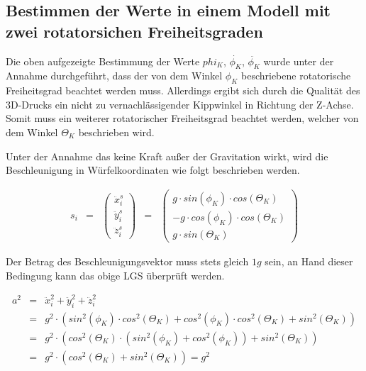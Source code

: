 \documentclass{article}
\begin{document}
\subsection{Bestimmen der Werte in einem Modell mit zwei rotatorsichen Freiheitsgraden}
Die oben aufgezeigte Bestimmung der Werte $phi_K$, $\dot{\phi_K}$, $\ddot{\phi_K}$ wurde unter der Annahme durchgeführt, dass der von dem Winkel $\phi_K$ beschriebene rotatorische Freiheitsgrad beachtet werden muss. Allerdings ergibt sich durch die Qualität des 3D-Drucks ein nicht zu vernachlässigender Kippwinkel in Richtung der Z-Achse. Somit muss ein weiterer rotatorischer Freiheitsgrad beachtet werden, welcher von dem Winkel $\Theta_K$ beschrieben wird.

Unter der Annahme das keine Kraft außer der Gravitation wirkt, wird die Beschleunigung in Würfelkoordinaten wie folgt beschrieben werden.

\begin{equation}
\begin{array}{lclcl}
s_i 
& = & 
\begin{pmatrix} \ddot{x}^s_{i} \\ \ddot{y}^s_i \\ \ddot{z}^s_i \end{pmatrix}
& = &
\begin{pmatrix} 
g \cdot sin(\phi_K) \cdot cos(\Theta_K) \\
-g \cdot cos(\phi_K) \cdot cos(\Theta_K) \\
g \cdot sin(\Theta_K)
\end{pmatrix}
\end{array}
\end{equation}

Der Betrag des Beschleunigungsvektor muss stets gleich $1g$ sein, an Hand dieser Bedingung kann das obige LGS überprüft werden.

\begin{equation}
\begin{array}{lcl}
a^2 
& = &
\ddot{x}^2_i + \ddot{y}^2_i + \ddot{z}^2_i \\
 & = &
g^2 \cdot ( sin^2(\phi_K) \cdot cos^2(\Theta_K) + cos^2(\phi_K) \cdot cos^2(\Theta_K) + sin^2(\Theta_K) ) \\
& = &
g^2 \cdot ( cos^2(\Theta_K) \cdot (sin^2(\phi_K) + cos^2(\phi_K) ) + sin^2(\Theta_K) ) \\
& = &
g^2 \cdot (cos^2(\Theta_K) + sin^2(\Theta_K)) = g^2
\end{array}
\end{equation}
\end{document}
